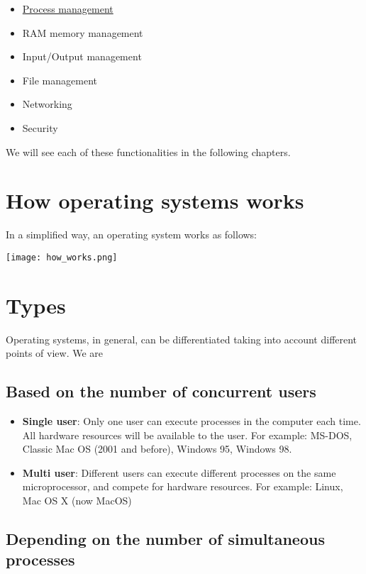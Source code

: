 \begin{itemize}
    \item \hyperlink{process_management}{Process management}
    \item RAM memory management
    \item Input/Output management
    \item File management
    \item Networking
    \item Security
\end{itemize}

We will see each of these functionalities in the following chapters.


\section{How operating systems works}

In a simplified way, an operating system works as follows:

\begin{center}
    \texttt{[image: how\_works.png]}
\end{center}



\section{Types}
Operating systems, in general, can be differentiated taking into account different points of view. We are

\subsection{Based on the number of concurrent users}
\begin{itemize}
    \item \textbf{Single user}: Only one user can execute processes in the computer each time. All hardware resources will be available to the user. For example: MS-DOS, Classic Mac OS (2001 and before), Windows 95, Windows 98.

    \item \textbf{Multi user}: Different users can execute different processes on the same microprocessor, and compete for hardware resources. For example: Linux, Mac OS X (now MacOS)
\end{itemize}

\subsection{Depending on the number of simultaneous processes}

